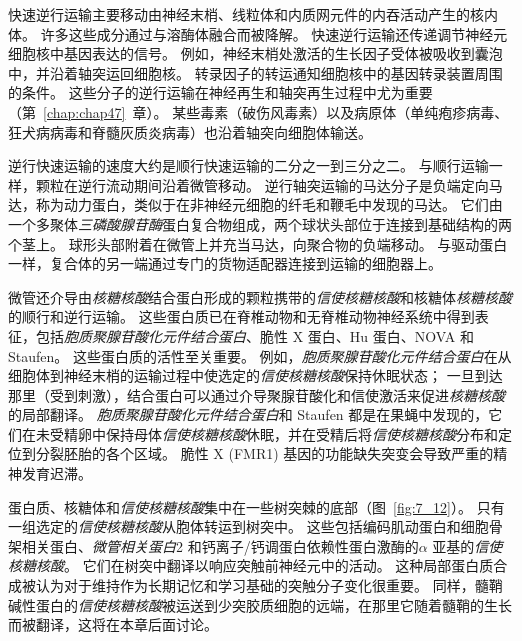 快速逆行运输主要移动由神经末梢、线粒体和内质网元件的内吞活动产生的核内体。
许多这些成分通过与溶酶体融合而被降解。
快速逆行运输还传递调节神经元细胞核中基因表达的信号。
例如，神经末梢处激活的生长因子受体被吸收到囊泡中，并沿着轴突运回细胞核。
转录因子的转运通知细胞核中的基因转录装置周围的条件。
这些分子的逆行运输在神经再生和轴突再生过程中尤为重要（第~\ref{chap:chap47}~章）。 
某些毒素（破伤风毒素）以及病原体（单纯疱疹病毒、狂犬病病毒和脊髓灰质炎病毒）也沿着轴突向细胞体输送。


逆行快速运输的速度大约是顺行快速运输的二分之一到三分之二。
与顺行运输一样，颗粒在逆行流动期间沿着微管移动。
逆行轴突运输的马达分子是负端定向马达，称为动力蛋白，类似于在非神经元细胞的纤毛和鞭毛中发现的马达。 它们由一个多聚体\textit{三磷酸腺苷酶}蛋白复合物组成，两个球状头部位于连接到基础结构的两个茎上。
球形头部附着在微管上并充当马达，向聚合物的负端移动。
与驱动蛋白一样，复合体的另一端通过专门的货物适配器连接到运输的细胞器上。


微管还介导由\textit{核糖核酸}结合蛋白形成的颗粒携带的\textit{信使核糖核酸}和核糖体\textit{核糖核酸}的顺行和逆行运输。
这些蛋白质已在脊椎动物和无脊椎动物神经系统中得到表征，包括\textit{胞质聚腺苷酸化元件结合蛋白}、脆性 X 蛋白、Hu 蛋白、NOVA 和 Staufen。
这些蛋白质的活性至关重要。
例如，\textit{胞质聚腺苷酸化元件结合蛋白}在从细胞体到神经末梢的运输过程中使选定的\textit{信使核糖核酸}保持休眠状态；
一旦到达那里（受到刺激），结合蛋白可以通过介导聚腺苷酸化和信使激活来促进\textit{核糖核酸}的局部翻译。
\textit{胞质聚腺苷酸化元件结合蛋白}和 Staufen 都是在果蝇中发现的，它们在未受精卵中保持母体\textit{信使核糖核酸}休眠，并在受精后将\textit{信使核糖核酸}分布和定位到分裂胚胎的各个区域。
脆性 X (FMR1) 基因的功能缺失突变会导致严重的精神发育迟滞。


蛋白质、核糖体和\textit{信使核糖核酸}集中在一些树突棘的底部（图~\ref{fig:7_12}）。
只有一组选定的\textit{信使核糖核酸}从胞体转运到树突中。
这些包括编码肌动蛋白和细胞骨架相关蛋白、\textit{微管相关蛋白}2 和钙离子/钙调蛋白依赖性蛋白激酶的$\alpha$ 亚基的\textit{信使核糖核酸}。
它们在树突中翻译以响应突触前神经元中的活动。
这种局部蛋白质合成被认为对于维持作为长期记忆和学习基础的突触分子变化很重要。
同样，髓鞘碱性蛋白的\textit{信使核糖核酸}被运送到少突胶质细胞的远端，在那里它随着髓鞘的生长而被翻译，这将在本章后面讨论。


